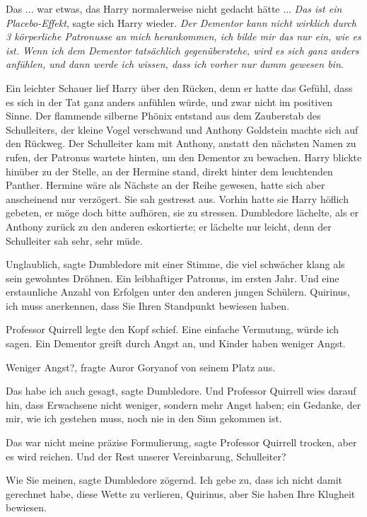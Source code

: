 Das ... war etwas, das Harry normalerweise nicht gedacht hätte ... \emph{Das ist
ein Placebo-Effekt}, sagte sich Harry wieder. \emph{Der Dementor kann nicht
wirklich durch 3 körperliche Patronusse an mich herankommen, ich bilde mir das
nur ein, wie es ist. Wenn ich dem Dementor tatsächlich gegenüberstehe, wird es
sich ganz anders anfühlen, und dann werde ich wissen, dass ich vorher nur dumm
gewesen bin}.

Ein leichter Schauer lief Harry über den Rücken, denn er hatte das Gefühl, dass
es sich in der Tat ganz anders anfühlen würde, und zwar nicht im positiven
Sinne. Der flammende silberne Phönix entstand aus dem Zauberstab des
Schulleiters, der kleine Vogel verschwand und Anthony Goldstein machte sich auf
den Rückweg. Der Schulleiter kam mit Anthony, anstatt den nächsten Namen zu
rufen, der Patronus wartete hinten, um den Dementor zu bewachen. Harry blickte
hinüber zu der Stelle, an der Hermine stand, direkt hinter dem leuchtenden
Panther. Hermine wäre als Nächste an der Reihe gewesen, hatte sich aber
anscheinend nur verzögert. Sie sah gestresst aus. Vorhin hatte sie Harry höflich
gebeten, er möge doch bitte aufhören, sie zu stressen. Dumbledore lächelte, als
er Anthony zurück zu den anderen eskortierte; er lächelte nur leicht, denn der
Schulleiter sah sehr, sehr müde.

\glqq{}Unglaublich\grqq{}, sagte Dumbledore mit einer Stimme, die viel schwächer
klang als sein gewohntes Dröhnen. \glqq{}Ein leibhaftiger Patronus, im ersten
Jahr. Und eine erstaunliche Anzahl von Erfolgen unter den anderen jungen
Schülern. Quirinus, ich muss anerkennen, dass Sie Ihren Standpunkt bewiesen
haben.\grqq{}

Professor Quirrell legte den Kopf schief. \glqq{}Eine einfache Vermutung, würde
ich sagen. Ein Dementor greift durch Angst an, und Kinder haben weniger Angst.\grqq{}

\glqq{}Weniger Angst?\grqq{}, fragte Auror Goryanof von seinem Platz aus.

\glqq{}Das habe ich auch gesagt\grqq{}, sagte Dumbledore. \glqq{}Und Professor
Quirrell wies darauf hin, dass Erwachsene nicht weniger, sondern mehr Angst
haben; ein Gedanke, der mir, wie ich gestehen muss, noch nie in den Sinn
gekommen ist.\grqq{}

\glqq{}Das war nicht meine präzise Formulierung\grqq{}, sagte Professor Quirrell
trocken, \glqq{}aber es wird reichen. Und der Rest unserer Vereinbarung,
Schulleiter?\grqq{}

\glqq{}Wie Sie meinen\grqq{}, sagte Dumbledore zögernd. \glqq{}Ich gebe zu, dass
ich nicht damit gerechnet habe, diese Wette zu verlieren, Quirinus, aber Sie
haben Ihre Klugheit bewiesen.\grqq{}

